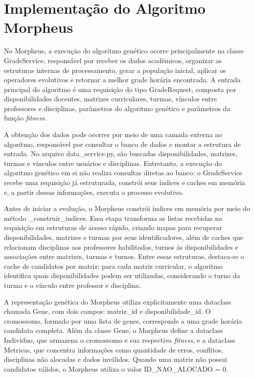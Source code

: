 \section{Implementação do Algoritmo Morpheus}
\label{sec:7.2}

No Morpheus, a execução do algoritmo genético ocorre principalmente na classe GradeService, responsável por receber os dados acadêmicos, organizar as estruturas internas de processamento, gerar a população inicial, aplicar os operadores evolutivos e retornar a melhor grade horária encontrada. A entrada principal do algoritmo é uma requisição do tipo GradeRequest, composta por disponibilidades docentes, matrizes curriculares, turmas, vínculos entre professores e disciplinas, parâmetros do algoritmo genético e parâmetros da função \textit{fitness}.

A obtenção dos dados pode ocorrer por meio de uma camada externa ao algoritmo, responsável por consultar o banco de dados e montar a estrutura de entrada. No arquivo data\_service.py, são buscadas disponibilidades, matrizes, turmas e vínculos entre usuários e disciplinas. Entretanto, a execução do algoritmo genético em si não realiza consultas diretas ao banco: o GradeService recebe uma requisição já estruturada, constrói seus índices e caches em memória e, a partir dessas informações, executa o processo evolutivo.

Antes de iniciar a evolução, o Morpheus constrói índices em memória por meio do método \_construir\_indices. Essa etapa transforma as listas recebidas na requisição em estruturas de acesso rápido, criando mapas para recuperar disponibilidades, matrizes e turmas por seus identificadores, além de caches que relacionam disciplinas aos professores habilitados, turnos às disponibilidades e associações entre matrizes, turmas e turnos. Entre essas estruturas, destaca-se o cache de candidatos por matriz: para cada matriz curricular, o algoritmo identifica quais disponibilidades podem ser utilizadas, considerando o turno da turma e o vínculo entre professor e disciplina.

A representação genética do Morpheus utiliza explicitamente uma dataclass chamada Gene, com dois campos: matriz\_id e disponibilidade\_id. O cromossomo, formado por uma lista de genes, corresponde a uma grade horária candidata completa. Além da classe Gene, o Morpheus define a dataclass Individuo, que armazena o cromossomo e sua respectiva \textit{fitness}, e a dataclass Metricas, que concentra informações como quantidade de erros, conflitos, disciplinas não alocadas e dados inválidos. Quando uma matriz não possui candidatos válidos, o Morpheus utiliza o valor ID\_NAO\_ALOCADO = 0.

